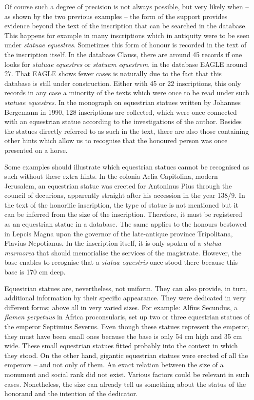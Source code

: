 \documentclass{article}
\begin{document}
Of course such a degree of precision is not always possible, but very likely when 
– as shown by the two previous examples – the form of the support provides 
evidence beyond the text of the inscription that can be searched in the database. 
This happens for example in many inscriptions which in antiquity were to be seen 
under \textit{statuae equestres}. Sometimes this form of honour is recorded in 
the text of the inscription itself. In the database Clauss, there are around 45 
records if one looks for \textit{statuae equestres }or \textit{statuam equestrem},\textit{ 
}in the database EAGLE around 27. That EAGLE shows fewer cases is naturally due 
to the fact that this database is still under construction. Either with 45 or 22 
inscriptions, this only records in any case a minority of the texts which were 
once to be read under such \textit{statuae equestres}. In the monograph on equestrian 
statues written by Johannes Bergemann in 1990, 128 inscriptions are collected, 
which were once connected with an equestrian statue according to the investigations 
of the author. Besides the statues directly referred to as such in the text, there 
are also those containing other hints which allow us to recognise that the honoured 
person was once presented on a horse. 

Some examples should illustrate which equestrian statues cannot be recognised as 
such without these extra hints. In the colonia Aelia Capitolina, modern Jerusalem, 
an equestrian statue was erected for Antoninus Pius through the council of decurions, 
apparently straight after his accession in the year 138/9. In the text of the honorific 
inscription, the type of statue is not mentioned but it can be inferred from the 
size of the inscription. Therefore, it must be registered as an equestrian statue 
in a database. The same applies to the honours bestowed in Lepcis Magna upon the 
governor of the late-antique province Tripolitana, Flavius Nepotianus. In the inscription 
itself, it is only spoken of a \textit{statua marmorea} that should memorialise 
the services of the magistrate. However, the base enables to recognise that a \textit{statua 
equestris }once stood there because this base is 170 cm deep. 

Equestrian statues are, nevertheless, not uniform. They can also provide, in turn, 
additional information by their specific appearance. They were dedicated in very 
different forms; above all in very varied sizes. For example: Alfius Secundus, 
a \textit{flamen perpetuus }in Africa proconsularis, set up two or three equestrian 
statues of the emperor Septimius Severus. Even though these statues represent the 
emperor, they must have been small ones because the base is only 54 cm high and 
35 cm wide. These small equestrian statues fitted probably into the context in 
which they stood. On the other hand, gigantic equestrian statues were erected of 
all the emperors – and not only of them. An exact relation between the size of 
a monument and social rank did not exist. Various factors could be relevant in 
such cases. Nonetheless, the size can already tell us something about the status 
of the honorand and the intention of the dedicator. 
\end{document}
